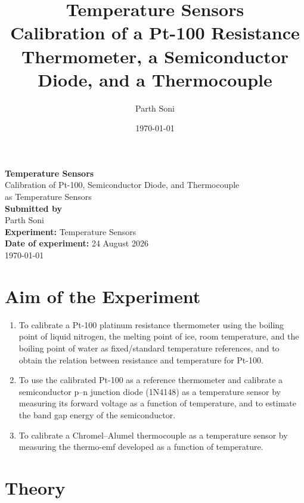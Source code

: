 \documentclass[11pt,a4paper]{article}
\title{\textbf{Temperature Sensors} \\[4pt] \large Calibration of a Pt-100 Resistance Thermometer, a Semiconductor Diode, and a Thermocouple}
\author{Parth Soni}
\date{\today}
\begin{document}
\begin{titlepage}
\centering
\vspace*{2cm}
{\Huge \textbf{Temperature Sensors}}\\[0.5cm]
{\Large Calibration of Pt-100, Semiconductor Diode, and Thermocouple\\ as Temperature Sensors}\\[2cm]

{\large \textbf{Submitted by}}\\[0.3cm]
{\large Parth Soni}\\[2cm]

{\large \textbf{Experiment:} Temperature Sensors}\\[0.3cm]
{\large \textbf{Date of experiment:} 24 August 2026}\\[0.3cm]

\vfill
{\large \today}
\end{titlepage}

\tableofcontents
\newpage

\section{Aim of the Experiment}
\begin{enumerate}[label=(\roman*)]
    \item To calibrate a Pt-100 platinum resistance thermometer using the boiling point of liquid nitrogen, the melting point of ice, room temperature, and the boiling point of water as fixed/standard temperature references, and to obtain the relation between resistance and temperature for Pt-100.
    \item To use the calibrated Pt-100 as a reference thermometer and calibrate a semiconductor p--n junction diode (1N4148) as a temperature sensor by measuring its forward voltage as a function of temperature, and to estimate the band gap energy of the semiconductor.
    \item To calibrate a Chromel--Alumel thermocouple as a temperature sensor by measuring the thermo-emf developed as a function of temperature.
\end{enumerate}

\section{Theory}
\end{document}
